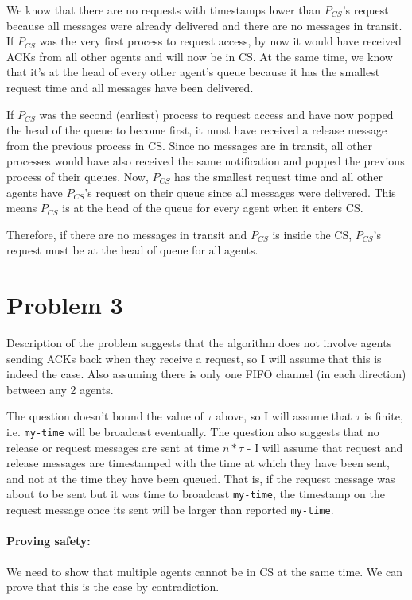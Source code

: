 \documentclass[10pt,letter]{article}
\begin{document}
We know that there are no requests with timestamps lower than $P_{CS}$'s request because all messages were already delivered and there are no messages in transit. If $P_{CS}$ was the very first process to request access, by now it would have received ACKs from all other agents and will now be in CS. At the same time, we know that it's at the head of every other agent's queue because it has the smallest request time and all messages have been delivered.

If $P_{CS}$ was the second (earliest) process to request access and have now popped the head of the queue to become first, it must have received a release message from the previous process in CS. Since no messages are in transit, all other processes would have also received the same notification and popped the previous process of their queues. Now, $P_{CS}$ has the smallest request time and all other agents have $P_{CS}$'s request on their queue since all messages were delivered. This means $P_{CS}$ is at the head of the queue for every agent when it enters CS.

Therefore, if there are no messages in transit and $P_{CS}$ is inside the CS, $P_{CS}$'s request must be at the head of queue for all agents.

\section*{Problem 3}

Description of the problem suggests that the algorithm does not involve agents sending ACKs back when they receive a request, so I will assume that this is indeed the case. Also assuming there is only one FIFO channel (in each direction) between any 2 agents.

The question doesn't bound the value of $\tau$ above, so I will assume that $\tau$ is finite, i.e. \texttt{my-time} will be broadcast eventually. The question also suggests that no release or request messages are sent at time $n*\tau$ - I will assume that request and release messages are timestamped with the time at which they have been sent, and not at the time they have been queued. That is, if the request message was about to be sent but it was time to broadcast \texttt{my-time}, the timestamp on the request message once its sent will be larger than reported \texttt{my-time}.

\paragraph{Proving safety:} We need to show that multiple agents cannot be in CS at the same time. We can prove that this is the case by contradiction.
\end{document}
